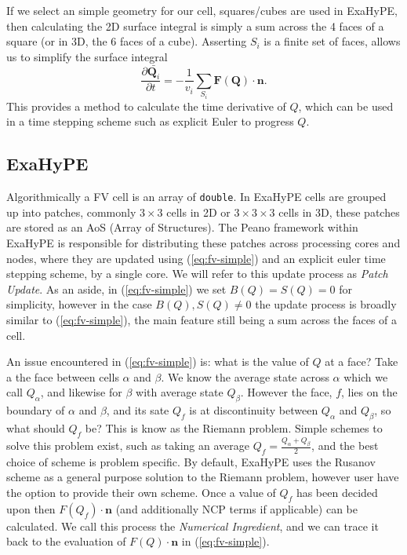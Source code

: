 If we select an simple geometry for our cell, squares/cubes are used in ExaHyPE, then calculating the 2D surface integral is simply a sum across the 4 faces of a square (or in 3D, the 6 faces of a cube).
Asserting $S_i$ is a finite set of faces, allows us to simplify the surface integral
\begin{equation}\label{eq:fv-simple}
   \frac{\partial \bar{\mathbf{Q}_i}}{\partial t} = -\frac{1}{v_i} \sum_{S_i}\mathbf{F}(\mathbf{Q})\cdot \mathbf{n}.
\end{equation}
This provides a method to calculate the time derivative of $Q$, which can be used in a time stepping scheme such as explicit Euler to progress $Q$.


\subsection{ExaHyPE}
\newcommand{\proc}[1]{\textit{#1}}
Algorithmically a FV cell is an array of \lstinline{double}.
In ExaHyPE cells are grouped up into patches, commonly $3\times 3$ cells in 2D or $3\times 3 \times 3$ cells in 3D, these patches are stored as an AoS (Array of Structures).
The Peano framework within ExaHyPE is responsible for distributing these patches across processing cores and nodes, where they are updated using (\ref{eq:fv-simple}) and an explicit euler time stepping scheme, by a single core.
We will refer to this update process as \proc{Patch Update}.
As an aside, in (\ref{eq:fv-simple}) we set $B(Q)=S(Q)=0$ for simplicity, however in the case $B(Q), S(Q)\neq 0$ the update process is broadly similar to (\ref{eq:fv-simple}), the main feature still being a sum across the faces of a cell.

An issue encountered in (\ref{eq:fv-simple}) is: what is the value of $Q$ at a face?
Take a the face between cells $\alpha$ and $\beta$.
We know the average state across $\alpha$ which we call $Q_\alpha$, and likewise for $\beta$ with average state $Q_\beta$.
However the face, $f$, lies on the boundary of $\alpha$ and $\beta$, and its sate $Q_f$ is at discontinuity between $Q_\alpha$ and $Q_\beta$, so what should $Q_f$ be?
This is know as the Riemann problem.
Simple schemes to solve this problem exist, such as taking an average $Q_f = \frac{Q_\alpha + Q_\beta}{2}$, and the best choice of scheme is problem specific.
By default, ExaHyPE uses the Rusanov scheme \cite{rusanov} as a general purpose solution to the Riemann problem, however user have the option to provide their own scheme.
Once a value of $Q_f$ has been decided upon then $F(Q_f)\cdot \mathbf{n}$ (and additionally NCP terms if applicable) can be calculated.
We call this process the \proc{Numerical Ingredient}, and we can trace it back to the evaluation of $F(Q)\cdot\mathbf{n}$ in (\ref{eq:fv-simple}).

